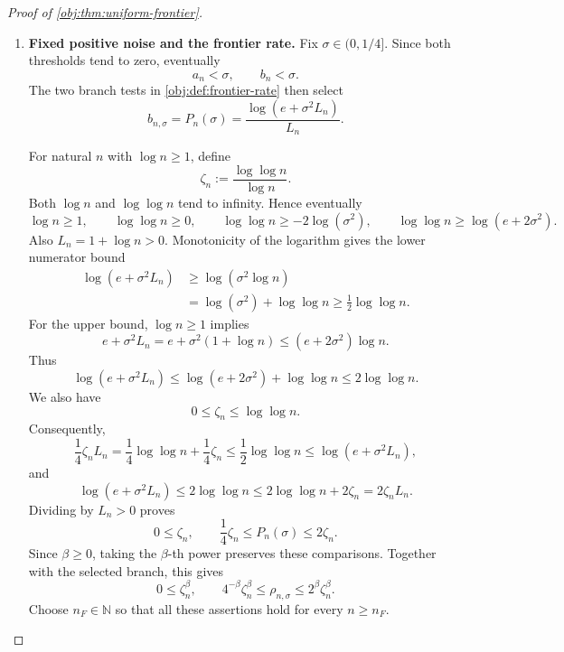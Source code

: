 \begin{proof}[Proof of \cref{obj:thm:uniform-frontier}]
\begin{enumerate}
For \(\sigma\in[b_n/\omega_{\mathrm{win}},\omega_{\mathrm{win}}b_n]\), combine both window comparisons with the second-threshold bounds:
\[
\begin{aligned}
P_n(\sigma)
&\le M_{\mathrm P,\omega_{\mathrm{win}}}P_n(b_n)
\le M_{\mathrm P,\omega_{\mathrm{win}}}C_EF_n(b_n)\\
&\le M_{\mathrm P,\omega_{\mathrm{win}}}C_EM_{\mathrm F,\omega_{\mathrm{win}}}F_n(\sigma)
\le C_KF_n(\sigma),\\
F_n(\sigma)
&\le M_{\mathrm F,\omega_{\mathrm{win}}}F_n(b_n)
\le M_{\mathrm F,\omega_{\mathrm{win}}}C_EP_n(b_n)\\
&\le M_{\mathrm F,\omega_{\mathrm{win}}}C_EM_{\mathrm P,\omega_{\mathrm{win}}}P_n(\sigma)
\le C_KP_n(\sigma).
\end{aligned}
\]
Dividing the first inequality by \(C_K\) establishes
\[
C_K^{-1}P_n(\sigma)\le F_n(\sigma)\le C_KP_n(\sigma).
\]
The choices of \(C_K,n_K\) precede the choice of \(\sigma\), and the same choices apply to both entire windows.

\item \textbf{Fixed positive noise and the frontier rate.}
Fix \(\sigma\in(0,1/4]\). Since both thresholds tend to zero, eventually
\[
a_n<\sigma,\qquad b_n<\sigma.
\]
The two branch tests in \cref{obj:def:frontier-rate} then select
\[
b_{n,\sigma}=P_n(\sigma)
=\frac{\log(e+\sigma^2L_n)}{L_n}.
\]

For natural \(n\) with \(\log n\ge1\), define
\[
\zeta_n:=\frac{\log\log n}{\log n}.
\]
Both \(\log n\) and \(\log\log n\) tend to infinity. Hence eventually
\[
\log n\ge1,\qquad
\log\log n\ge0,\qquad
\log\log n\ge-2\log(\sigma^2),
\qquad
\log\log n\ge\log(e+2\sigma^2).
\]
Also \(L_n=1+\log n>0\). Monotonicity of the logarithm gives the lower numerator bound
\[
\begin{aligned}
\log(e+\sigma^2L_n)
&\ge\log(\sigma^2\log n)\\
&=\log(\sigma^2)+\log\log n
\ge\frac12\log\log n.
\end{aligned}
\]
For the upper bound, \(\log n\ge1\) implies
\[
e+\sigma^2L_n
=e+\sigma^2(1+\log n)
\le(e+2\sigma^2)\log n.
\]
Thus
\[
\log(e+\sigma^2L_n)
\le\log(e+2\sigma^2)+\log\log n
\le2\log\log n.
\]
We also have
\[
0\le\zeta_n\le\log\log n.
\]
Consequently,
\[
\frac14\zeta_nL_n
=\frac14\log\log n+\frac14\zeta_n
\le\frac12\log\log n
\le\log(e+\sigma^2L_n),
\]
and
\[
\log(e+\sigma^2L_n)
\le2\log\log n
\le2\log\log n+2\zeta_n
=2\zeta_nL_n.
\]
Dividing by \(L_n>0\) proves
\[
0\le\zeta_n,\qquad
\frac14\zeta_n\le P_n(\sigma)\le2\zeta_n.
\]
Since \(\beta\ge0\), taking the \(\beta\)-th power preserves these comparisons. Together with the selected branch, this gives
\[
0\le\zeta_n^\beta,\qquad
4^{-\beta}\zeta_n^\beta
\le\rho_{n,\sigma}
\le2^\beta\zeta_n^\beta.
\]
Choose \(n_F\in\mathbb N\) so that all these assertions hold for every \(n\ge n_F\).


\end{enumerate}
\end{proof}
